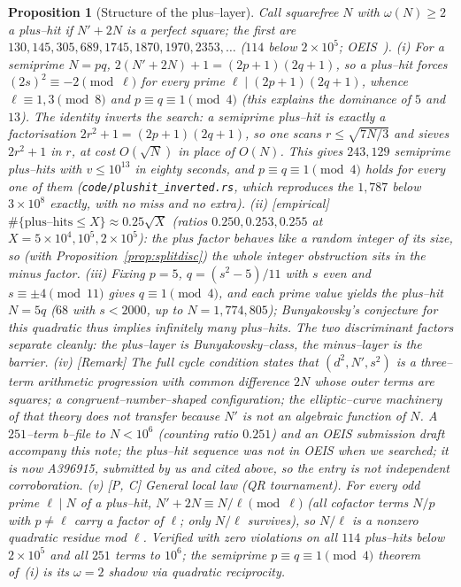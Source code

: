 \documentclass[11pt]{article}
\newtheorem{proposition}[theorem]{Proposition}
\theoremstyle{definition}
\begin{document}
\begin{proposition}[Structure of the plus--layer]\label{prop:plus}
Call squarefree $N$ with $\omega(N)\ge2$ a \emph{plus--hit} if $N'+2N$ is a perfect square; the first
are $130,145,305,689,1745,1870,1970,2353,\dots$ \textup{(}$114$ below $2\times10^5$; OEIS~\cite{OEIS_A396915}\textup{)}.
\textup{(i)} For a semiprime $N=pq$, $2(N'+2N)+1=(2p+1)(2q+1)$, so a plus--hit forces
$(2s)^2\equiv-2\pmod\ell$ for every prime $\ell\mid(2p+1)(2q+1)$, whence $\ell\equiv1,3\pmod8$ and
$p\equiv q\equiv1\pmod4$ (this explains the dominance of $5$ and $13$).
The identity inverts the search: a semiprime plus--hit is exactly a factorisation
$2r^2+1=(2p+1)(2q+1)$, so one scans $r\le\sqrt{7N/3}$ and sieves $2r^2+1$ in $r$, at cost
$O(\sqrt N)$ in place of $O(N)$. This gives $243{,}129$ semiprime plus--hits with $v\le10^{13}$ in
eighty seconds, and $p\equiv q\equiv1\pmod4$ holds for every one of them
\textup{(\texttt{code/plushit\_inverted.rs}, which reproduces the $1{,}787$ below $3\times10^8$
exactly, with no miss and no extra)}. \textup{(ii)} \textup{[}empirical\textup{]} $\#\{\text{plus--hits}\le X\}\approx0.25\sqrt X$
(ratios $0.250,0.253,0.255$ at $X=5\!\times\!10^4,10^5,2\!\times\!10^5$): the plus factor behaves like
a random integer of its size, so (with Proposition~\ref{prop:splitdisc}) the whole integer
obstruction sits in the minus factor. \textup{(iii)} Fixing $p=5$, $q=(s^2-5)/11$ with $s$ even and
$s\equiv\pm4\pmod{11}$ gives $q\equiv1\pmod4$, and each prime value yields the plus--hit $N=5q$
($68$ with $s<2000$, up to $N=1{,}774{,}805$); Bunyakovsky's conjecture for this quadratic thus
implies infinitely many plus--hits. The two discriminant factors separate cleanly: the plus--layer is
Bunyakovsky--class, the minus--layer is the barrier.
\textup{(iv)} [Remark] The full cycle condition states that $(d^2,N',s^2)$ is a three--term
arithmetic progression with common difference $2N$ whose outer terms are squares; a
congruent--number--shaped configuration; the elliptic--curve machinery of that theory does not
transfer because $N'$ is not an algebraic function of $N$. A $251$--term b--file to $N<10^6$
(counting ratio $0.251$) and an OEIS submission draft accompany this note; the plus--hit
sequence was not in OEIS when we searched; it is now A396915, submitted by us and cited above, so the entry is not independent corroboration.
\textup{(v)} [P, C] \emph{General local law (QR tournament).} For every odd prime $\ell\mid N$ of
a plus--hit, $N'+2N\equiv N/\ell\pmod\ell$ (all cofactor terms $N/p$ with $p\ne\ell$ carry a factor
of $\ell$; only $N/\ell$ survives), so $N/\ell$ is a nonzero quadratic residue mod $\ell$. Verified
with zero violations on all $114$ plus--hits below $2\times10^5$ and all $251$ terms to $10^6$;
the semiprime $p\equiv q\equiv1\pmod4$ theorem of~\textup{(i)} is its $\omega=2$ shadow via quadratic
reciprocity.
\end{proposition}
\end{document}

